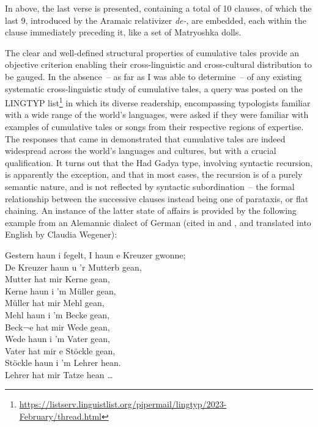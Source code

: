 \documentclass[output=paper,colorlinks,citecolor=brown
]{langscibook}
\begin{document}
\z

In  above, the last verse is presented, containing a total of 10 clauses, of which the last 9, introduced by the Aramaic relativizer \textit{de-}, are embedded, each within the clause immediately preceding it, like a set of Matryoshka dolls.  

The clear and well-defined structural properties of cumulative tales provide an objective criterion enabling their cross-linguistic and cross-cultural distribution to be gauged.  In the absence~– as far as I was able to determine~– of any existing systematic cross-linguistic study of cumulative tales, a query was posted on the LINGTYP list\footnote{\url{https://listserv.linguistlist.org/pipermail/lingtyp/2023-February/thread.html}} in which its diverse readership, encompassing typologists familiar with a wide range of the world's languages, were asked if they were familiar with examples of cumulative  tales or songs from their respective regions of expertise.  The responses that came in demonstrated that cumulative tales are indeed widespread across the world's languages and cultures, but with a crucial qualification.  It turns out that the Had Gadya type, involving syntactic recursion, is apparently the exception, and that in most cases, the recursion is of a purely semantic nature, and is not reflected by syntactic subordination~– the formal relationship between the successive clauses instead being one of parataxis, or flat chaining.  An instance of the latter state of affairs is provided by the following example from an Alemannic dialect of German (cited in 
\cite[65]{meier1851deutsche} and \cite[39]{newell1905passover}, and translated into English by Claudia Wegener):

\ea \label{ex:gil:11}

Gestern haun i fegelt, I haun e Kreuzer gwonne;\\
De Kreuzer haun u 'r Mutterb gean,\\
Mutter hat mir Kerne gean,\\
Kerne haun i 'm Müller gean,\\
Müller hat mir Mehl gean,\\
Mehl haun i 'm Becke gean,\\
Beck¬e hat mir Wede gean,\\
Wede haun i 'm Vater gean,\\
Vater hat mir e Stöckle gean,\\
Stöckle haun i 'm Lehrer hean.\\
Lehrer hat mir Tatze hean  \ldots \\
 
\end{document}

